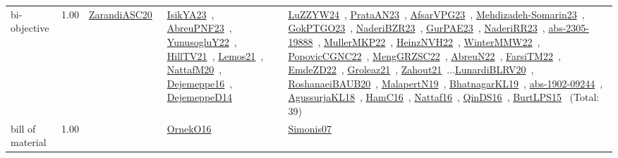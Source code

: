 {\begin{longtable}{p{3cm}r>{\raggedright\arraybackslash}p{6cm}>{\raggedright\arraybackslash}p{6cm}>{\raggedright\arraybackslash}p{8cm}}
\index{bi-objective}\index{Concepts!bi-objective}bi-objective &  1.00 & \href{../works/ZarandiASC20.pdf}{ZarandiASC20}~\cite{ZarandiASC20} & \href{../works/IsikYA23.pdf}{IsikYA23}~\cite{IsikYA23}, \href{../works/AbreuPNF23.pdf}{AbreuPNF23}~\cite{AbreuPNF23}, \href{../works/YunusogluY22.pdf}{YunusogluY22}~\cite{YunusogluY22}, \href{../works/HillTV21.pdf}{HillTV21}~\cite{HillTV21}, \href{../works/Lemos21.pdf}{Lemos21}~\cite{Lemos21}, \href{../works/NattafM20.pdf}{NattafM20}~\cite{NattafM20}, \href{../works/Dejemeppe16.pdf}{Dejemeppe16}~\cite{Dejemeppe16}, \href{../works/DejemeppeD14.pdf}{DejemeppeD14}~\cite{DejemeppeD14} & \href{../works/LuZZYW24.pdf}{LuZZYW24}~\cite{LuZZYW24}, \href{../works/PrataAN23.pdf}{PrataAN23}~\cite{PrataAN23}, \href{../works/AfsarVPG23.pdf}{AfsarVPG23}~\cite{AfsarVPG23}, \href{../works/Mehdizadeh-Somarin23.pdf}{Mehdizadeh-Somarin23}~\cite{Mehdizadeh-Somarin23}, \href{../works/GokPTGO23.pdf}{GokPTGO23}~\cite{GokPTGO23}, \href{../works/NaderiBZR23.pdf}{NaderiBZR23}~\cite{NaderiBZR23}, \href{../works/GurPAE23.pdf}{GurPAE23}~\cite{GurPAE23}, \href{../works/NaderiRR23.pdf}{NaderiRR23}~\cite{NaderiRR23}, \href{../works/abs-2305-19888.pdf}{abs-2305-19888}~\cite{abs-2305-19888}, \href{../works/MullerMKP22.pdf}{MullerMKP22}~\cite{MullerMKP22}, \href{../works/HeinzNVH22.pdf}{HeinzNVH22}~\cite{HeinzNVH22}, \href{../works/WinterMMW22.pdf}{WinterMMW22}~\cite{WinterMMW22}, \href{../works/PopovicCGNC22.pdf}{PopovicCGNC22}~\cite{PopovicCGNC22}, \href{../works/MengGRZSC22.pdf}{MengGRZSC22}~\cite{MengGRZSC22}, \href{../works/AbreuN22.pdf}{AbreuN22}~\cite{AbreuN22}, \href{../works/FarsiTM22.pdf}{FarsiTM22}~\cite{FarsiTM22}, \href{../works/EmdeZD22.pdf}{EmdeZD22}~\cite{EmdeZD22}, \href{../works/Groleaz21.pdf}{Groleaz21}~\cite{Groleaz21}, \href{../works/Zahout21.pdf}{Zahout21}~\cite{Zahout21}...\href{../works/LunardiBLRV20.pdf}{LunardiBLRV20}~\cite{LunardiBLRV20}, \href{../works/RoshanaeiBAUB20.pdf}{RoshanaeiBAUB20}~\cite{RoshanaeiBAUB20}, \href{../works/MalapertN19.pdf}{MalapertN19}~\cite{MalapertN19}, \href{../works/BhatnagarKL19.pdf}{BhatnagarKL19}~\cite{BhatnagarKL19}, \href{../works/abs-1902-09244.pdf}{abs-1902-09244}~\cite{abs-1902-09244}, \href{../works/AgussurjaKL18.pdf}{AgussurjaKL18}~\cite{AgussurjaKL18}, \href{../works/HamC16.pdf}{HamC16}~\cite{HamC16}, \href{../works/Nattaf16.pdf}{Nattaf16}~\cite{Nattaf16}, \href{../works/QinDS16.pdf}{QinDS16}~\cite{QinDS16}, \href{../works/BurtLPS15.pdf}{BurtLPS15}~\cite{BurtLPS15} (Total: 39)\\
\index{bill of material}\index{Concepts!bill of material}bill of material &  1.00 &  & \href{../works/OrnekO16.pdf}{OrnekO16}~\cite{OrnekO16} & \href{../works/Simonis07.pdf}{Simonis07}~\cite{Simonis07}\\

\end{longtable}}
